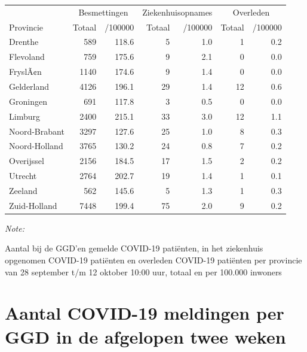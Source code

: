 \documentclass[
  english,
  man,floatsintext]{apa6}
\begin{document}
\begin{table}
\centering
\begin{threeparttable}
\begin{tabular}{lrrrrrr}
\toprule
\multicolumn{1}{c}{ } & \multicolumn{2}{c}{Besmettingen} & \multicolumn{2}{c}{Ziekenhuisopnames} & \multicolumn{2}{c}{Overleden} \\
\cmidrule(l{3pt}r{3pt}){2-3} \cmidrule(l{3pt}r{3pt}){4-5} \cmidrule(l{3pt}r{3pt}){6-7}
Provincie & Totaal & /100000 & Totaal & /100000 & Totaal & /100000\\
\midrule
Drenthe & 589 & 118.6 & 5 & 1.0 & 1 & 0.2\\
Flevoland & 759 & 175.6 & 9 & 2.1 & 0 & 0.0\\
FryslÃ¢n & 1140 & 174.6 & 9 & 1.4 & 0 & 0.0\\
Gelderland & 4126 & 196.1 & 29 & 1.4 & 12 & 0.6\\
Groningen & 691 & 117.8 & 3 & 0.5 & 0 & 0.0\\
Limburg & 2400 & 215.1 & 33 & 3.0 & 12 & 1.1\\
Noord-Brabant & 3297 & 127.6 & 25 & 1.0 & 8 & 0.3\\
Noord-Holland & 3765 & 130.2 & 24 & 0.8 & 7 & 0.2\\
Overijssel & 2156 & 184.5 & 17 & 1.5 & 2 & 0.2\\
Utrecht & 2764 & 202.7 & 19 & 1.4 & 1 & 0.1\\
Zeeland & 562 & 145.6 & 5 & 1.3 & 1 & 0.3\\
Zuid-Holland & 7448 & 199.4 & 75 & 2.0 & 9 & 0.2\\
\bottomrule
\end{tabular}
\begin{tablenotes}
\item \textit{Note: } 
\item Aantal bij de GGD’en gemelde COVID-19 patiënten, in het ziekenhuis opgenomen COVID-19 patiënten en overleden COVID-19 patiënten per provincie van 28 september t/m 12 oktober 10:00 uur, totaal en per 100.000 inwoners
\end{tablenotes}
\end{threeparttable}
\end{table}

\newpage

\hypertarget{aantal-covid-19-meldingen-per-ggd-in-de-afgelopen-twee-weken}{%
\section{Aantal COVID-19 meldingen per GGD in de afgelopen twee weken}\label{aantal-covid-19-meldingen-per-ggd-in-de-afgelopen-twee-weken}}
\end{document}
